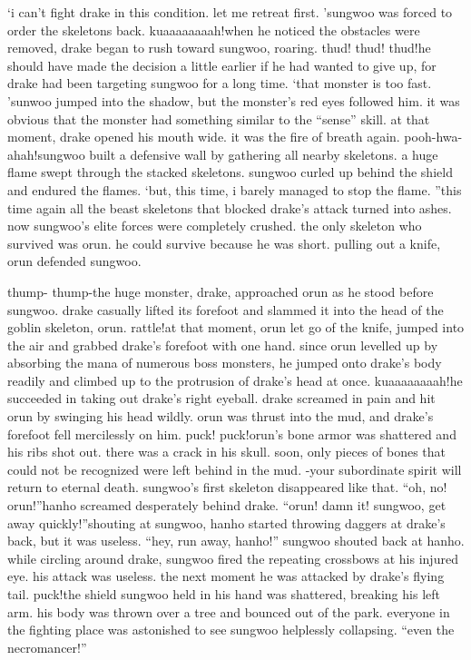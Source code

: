 ‘i can’t fight drake in this condition.
 let me retreat first.
’sungwoo was forced to order the skeletons back.
kuaaaaaaaah!when he noticed the obstacles were removed, drake began to rush toward sungwoo, roaring.
thud! thud! thud!he should have made the decision a little earlier if he had wanted to give up, for drake had been targeting sungwoo for a long time.
‘that monster is too fast.
’sunwoo jumped into the shadow, but the monster’s red eyes followed him.
it was obvious that the monster had something similar to the “sense” skill.
at that moment, drake opened his mouth wide.
 it was the fire of breath again.
pooh-hwa-ahah!sungwoo built a defensive wall by gathering all nearby skeletons.
a huge flame swept through the stacked skeletons.
 sungwoo curled up behind the shield and endured the flames.
‘but, this time, i barely managed to stop the flame.
”this time again all the beast skeletons that blocked drake’s attack turned into ashes.
 now sungwoo’s elite forces were completely crushed.
the only skeleton who survived was orun.
 he could survive because he was short.
 pulling out a knife, orun defended sungwoo.


thump- thump-the huge monster, drake, approached orun as he stood before sungwoo.
drake casually lifted its forefoot and slammed it into the head of the goblin skeleton, orun.
rattle!at that moment, orun let go of the knife, jumped into the air and grabbed drake’s forefoot with one hand.
since orun levelled up by absorbing the mana of numerous boss monsters, he jumped onto drake’s body readily and climbed up to the protrusion of drake’s head at once.
kuaaaaaaaah!he succeeded in taking out drake’s right eyeball.
 drake screamed in pain and hit orun by swinging his head wildly.
orun was thrust into the mud, and drake’s forefoot fell mercilessly on him.
puck! puck!orun’s bone armor was shattered and his ribs shot out.
 there was a crack in his skull.
soon, only pieces of bones that could not be recognized were left behind in the mud.
-your subordinate spirit will return to eternal death.
sungwoo’s first skeleton disappeared like that.
“oh, no! orun!”hanho screamed desperately behind drake.
“orun! damn it! sungwoo, get away quickly!”shouting at sungwoo, hanho started throwing daggers at drake’s back, but it was useless.
“hey, run away, hanho!” sungwoo shouted back at hanho.
while circling around drake, sungwoo fired the repeating crossbows at his injured eye.
 his attack was useless.
 the next moment he was attacked by drake’s flying tail.
puck!the shield sungwoo held in his hand was shattered, breaking his left arm.
his body was thrown over a tree and bounced out of the park.
 everyone in the fighting place was astonished to see sungwoo helplessly collapsing.
“even the necromancer!”

 